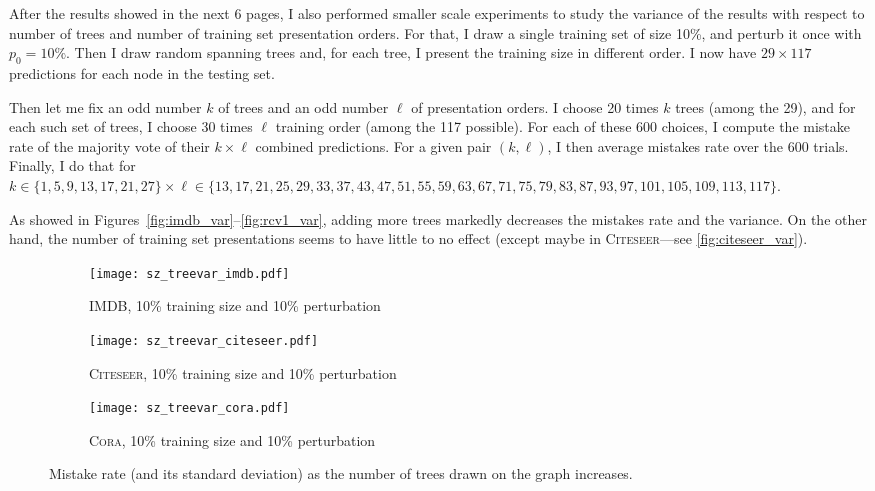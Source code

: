 \documentclass[a4paper,final,notitlepage,11pt,svgnames]{article}
\newcommand{\cora}{\textsc{Cora}}
\newcommand{\citeseer}{\textsc{Citeseer}}
\newcommand{\imdb}{\textsc{IMDB}}
\begin{document}
After the results showed in the next 6 pages,  I also performed smaller scale
experiments to study the variance of the results with respect to number of trees
and number of training set presentation orders. For that, I draw a single
training set of size 10\%, and perturb it once with $p_0=10\%$. Then I draw
 random spanning trees and, for each tree, I present the training size in
 different order. I now have $29\times 117$ predictions for each node in
the testing set.

Then let me fix an odd number $k$ of trees and an odd number $\ell$ of
presentation orders. I choose 20 times $k$ trees (among the 29), and for each
such set of trees, I choose 30 times $\ell$ training order (among the 117
possible). For each of these 600 choices, I compute the mistake rate of the
majority vote of their $k\times \ell$ combined predictions. For a given pair
$(k, \ell)$, I then average mistakes rate over the 600 trials. Finally, I do
that for $k \in \{1,5,9,13,17,21,27\} \times \ell \in \{13,  17,  21,  25,  29,
33,  37,  43,  47,  51,  55,  59, 63,  67,  71,  75,  79,  83,  87,  93,  97,
101, 105, 109, 113, 117\}$.

As showed in Figures~\ref{fig:imdb_var}--\ref{fig:rcv1_var}, adding more trees
markedly decreases the mistakes rate and the variance. On the other hand, the
number of training set presentations seems to have little to no effect (except
maybe in \citeseer{}---see \autoref{fig:citeseer_var}).

\iffalse
\newpage
{}
\pagestyle{empty}
\begin{figure*}[!p]
	\centering
	\begin{subfigure}[b]{.945\textwidth}
		\centering
		\texttt{[image: sz\_treevar\_imdb.pdf]}
		\caption{\imdb{}, 10\% training size and 10\% perturbation}
	\end{subfigure}
	\begin{subfigure}[b]{.945\textwidth}
		\centering
		\texttt{[image: sz\_treevar\_citeseer.pdf]}
		\caption{\citeseer{}, 10\% training size and 10\% perturbation}
	\end{subfigure}
	\begin{subfigure}[b]{.945\textwidth}
		\centering
		\texttt{[image: sz\_treevar\_cora.pdf]}
		\caption{\cora{}, 10\% training size and 10\% perturbation}
	\end{subfigure}
  \caption{Mistake rate (and its standard deviation) as the number of trees
  drawn on the graph increases. \label{fig:tree_variance}}
\end{figure*}
\clearpage
\restoregeometry
\end{document}
